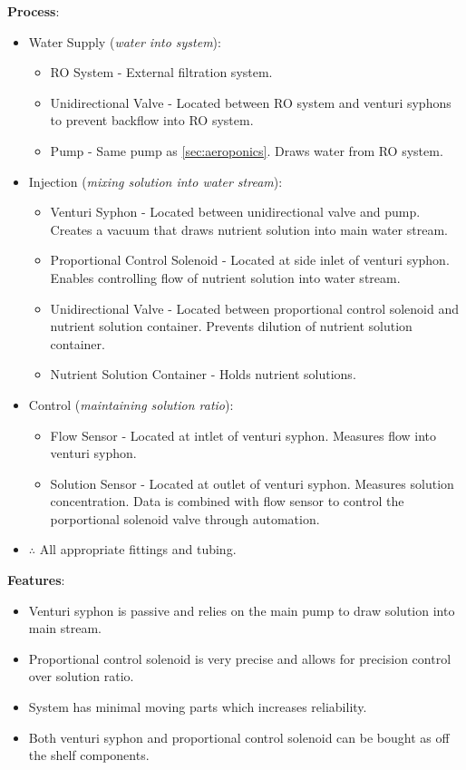\documentclass{report}
\begin{document}
\textbf{Process}:
\begin{itemize}
    \item Water Supply (\textit{water into system}):
    \begin{itemize}
        \item RO System - External filtration system. 
        \item Unidirectional Valve - Located between RO system and venturi syphons to prevent backflow into RO system.
        \item Pump - Same pump as \ref{sec:aeroponics}. Draws water from RO system.
    \end{itemize}
    \item Injection (\textit{mixing solution into water stream}):
    \begin{itemize}
        \item Venturi Syphon - Located between unidirectional valve and pump. Creates a vacuum that draws nutrient solution into main water stream.
        \item Proportional Control Solenoid - Located at side inlet of venturi syphon. Enables controlling flow of nutrient solution into water stream.
        \item Unidirectional Valve - Located between proportional control solenoid and nutrient solution container. Prevents dilution of nutrient solution container.
        \item Nutrient Solution Container - Holds nutrient solutions.
    \end{itemize}
    \item Control (\textit{maintaining solution ratio}):
    \begin{itemize}
        \item Flow Sensor - Located at intlet of venturi syphon. Measures flow into venturi syphon.
        \item Solution Sensor - Located at outlet of venturi syphon. Measures solution concentration. Data is combined with flow sensor to control the porportional solenoid valve through automation.
    \end{itemize}
    \item $\therefore$ All appropriate fittings and tubing.
\end{itemize}

\textbf{Features}:
\begin{itemize}
    \item Venturi syphon is passive and relies on the main pump to draw solution into main stream.
    \item Proportional control solenoid is very precise and allows for precision control over solution ratio.
    \item System has minimal moving parts which increases reliability.
    \item Both venturi syphon and proportional control solenoid can be bought as off the shelf components.
\end{itemize}
\end{document}
